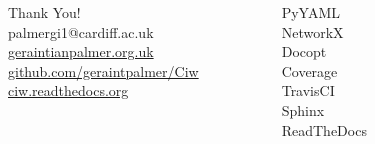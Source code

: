 \documentclass{beamer}
\begin{document}
\begin{frame}
\begin{columns}[b]
\begin{column}{.7\textwidth}
\begin{flushright}
\huge Thank You!\\[10mm]
\footnotesize palmergi1@cardiff.ac.uk\\[5mm]
\footnotesize \url{geraintianpalmer.org.uk}\\[5mm]
\footnotesize \url{github.com/geraintpalmer/Ciw}\\[5mm]
\footnotesize \url{ciw.readthedocs.org}\\[5mm]
\end{flushright}
\end{column}
\vrule{}
\begin{column}{.25\textwidth}
\begin{flushright}
\footnotesize PyYAML\\[1.75mm]
\footnotesize NetworkX\\[1.75mm]
\footnotesize Docopt\\[1.75mm]
\footnotesize Coverage\\[1.75mm]
\footnotesize TravisCI\\[1.75mm]
\footnotesize Sphinx\\[1.75mm]
\footnotesize ReadTheDocs\\[1.75mm]
\end{flushright}
\end{column}
\begin{column}{0.05\textwidth}
\end{column}
\end{columns}
\end{frame}
\end{document}

